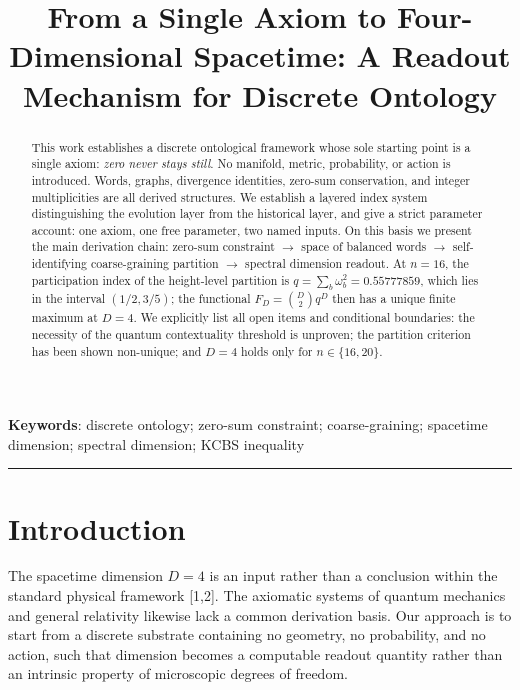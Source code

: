 \documentclass[
  11pt,
]{article}
\author{}
\date{}
\begin{document}
\title{From a Single Axiom to Four-Dimensional Spacetime: A Readout Mechanism for Discrete Ontology}
\author{}
\date{}
\maketitle

\begin{abstract}

This work establishes a discrete ontological framework whose sole
starting point is a single axiom: \emph{zero never stays still}. No
manifold, metric, probability, or action is introduced. Words, graphs,
divergence identities, zero-sum conservation, and integer multiplicities
are all derived structures. We establish a layered index system
distinguishing the evolution layer from the historical layer, and give a
strict parameter account: one axiom, one free parameter, two named
inputs. On this basis we present the main derivation chain: zero-sum
constraint \(\to\) space of balanced words \(\to\) self-identifying
coarse-graining partition \(\to\) spectral dimension readout. At
\(n=16\), the participation index of the height-level partition is
\(q=\sum_b\omega_b^2=0.55777859\), which lies in the interval
\((1/2,3/5)\); the functional \(F_D=\binom{D}{2}q^D\) then has a unique
finite maximum at \(D=4\). We explicitly list all open items and
conditional boundaries: the necessity of the quantum contextuality
threshold is unproven; the partition criterion has been shown
non-unique; and \(D=4\) holds only for \(n\in\{16,20\}\).

\end{abstract}

\noindent\textbf{Keywords}: discrete ontology; zero-sum constraint;
coarse-graining; spacetime dimension; spectral dimension; KCBS
inequality

\begin{center}\rule{0.5\linewidth}{0.5pt}\end{center}

\section{Introduction}\label{introduction}

The spacetime dimension \(D=4\) is an input rather than a conclusion
within the standard physical framework {[}1,2{]}. The axiomatic systems
of quantum mechanics and general relativity likewise lack a common
derivation basis. Our approach is to start from a discrete substrate
containing no geometry, no probability, and no action, such that
dimension becomes a computable readout quantity rather than an intrinsic
property of microscopic degrees of freedom.
\end{document}
